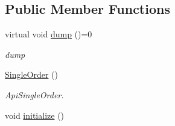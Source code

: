 \subsection*{Public Member Functions}
\begin{DoxyCompactItemize}
\item 
\hypertarget{class_a_p_i2_1_1_single_order_adf27a836445ead05dc2c39b4dd057e7f}{virtual void \hyperlink{class_a_p_i2_1_1_single_order_adf27a836445ead05dc2c39b4dd057e7f}{dump} ()=0}\label{class_a_p_i2_1_1_single_order_adf27a836445ead05dc2c39b4dd057e7f}

\begin{DoxyCompactList}\small\item\em dump \end{DoxyCompactList}\item 
\hypertarget{class_a_p_i2_1_1_single_order_aa6f1357a05c284c16a78f4c201d07dfe}{\hyperlink{class_a_p_i2_1_1_single_order_aa6f1357a05c284c16a78f4c201d07dfe}{Single\-Order} ()}\label{class_a_p_i2_1_1_single_order_aa6f1357a05c284c16a78f4c201d07dfe}

\begin{DoxyCompactList}\small\item\em Api\-Single\-Order. \end{DoxyCompactList}\item 
\hypertarget{class_a_p_i2_1_1_single_order_a40f1568727207de3f1e72c40d8b2081a}{void \hyperlink{class_a_p_i2_1_1_single_order_a40f1568727207de3f1e72c40d8b2081a}{initialize} ()}\label{class_a_p_i2_1_1_single_order_a40f1568727207de3f1e72c40d8b2081a}


\end{DoxyCompactItemize}
